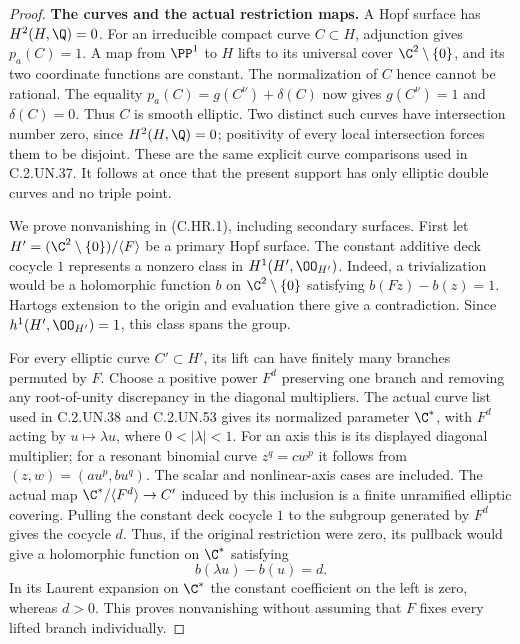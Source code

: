 \begin{proof}
\par\medskip\noindent\textbf{The curves and the actual restriction maps.}
A Hopf surface has $H^2(H,\Q)=0$. For an irreducible compact curve
$C\subset H$, adjunction gives $p_a(C)=1$. A map from $\PP^1$ to
$H$ lifts to its universal cover $\C^2\setminus\{0\}$, and its two
coordinate functions are constant. The normalization of $C$ hence
cannot be rational. The equality
$p_a(C)=g(C^\nu)+\delta(C)$ now gives $g(C^\nu)=1$ and
$\delta(C)=0$. Thus $C$ is smooth elliptic. Two distinct such
curves have intersection number zero, since $H^2(H,\Q)=0$;
positivity of every local intersection forces them to be disjoint.
These are the same explicit curve comparisons used in C.2.UN.37.
It follows at once that the present support has only elliptic
double curves and no triple point.

We prove nonvanishing in (C.HR.1), including secondary surfaces.
First let $H'=(\C^2\setminus\{0\})/\langle F\rangle$ be a primary
Hopf surface. The constant additive deck cocycle $1$ represents a
nonzero class in $H^1(H',\OO_{H'})$. Indeed, a trivialization would
be a holomorphic function $b$ on $\C^2\setminus\{0\}$ satisfying
$b(Fz)-b(z)=1$. Hartogs extension to the origin and evaluation there
give a contradiction. Since $h^1(H',\OO_{H'})=1$, this class spans
the group.

For every elliptic curve $C'\subset H'$, its lift can have finitely
many branches permuted by $F$. Choose a positive power $F^d$
preserving one branch and removing any root-of-unity discrepancy
in the diagonal multipliers. The actual curve list used in
C.2.UN.38 and C.2.UN.53 gives its normalized parameter $\C^*$,
with $F^d$ acting by $u\mapsto\lambda u$, where
$0<|\lambda|<1$. For an axis this is its displayed diagonal
multiplier; for a resonant binomial curve $z^q=cw^p$ it follows
from $(z,w)=(a u^p,b u^q)$. The scalar and nonlinear-axis cases
are included. The actual map
$\C^*/\langle F^d\rangle\to C'$ induced by this inclusion is a
finite unramified elliptic covering. Pulling the constant deck
cocycle $1$ to the subgroup generated by $F^d$ gives the cocycle
$d$. Thus, if the original restriction were zero, its pullback
would give a holomorphic function on $\C^*$ satisfying
\[
                         b(\lambda u)-b(u)=d.          \tag{C.HR.4}
\]
In its Laurent expansion on $\C^*$ the constant coefficient on
the left is zero, whereas $d>0$. This proves nonvanishing without
assuming that $F$ fixes every lifted branch individually.


\end{proof}
